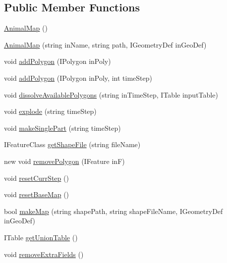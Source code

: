 \subsection*{Public Member Functions}
\begin{DoxyCompactItemize}
\item 
\hyperlink{class_s_e_a_r_c_h_1_1_animal_map_a79382e8c9a4e1cbaae3de901e0fd24ed}{Animal\-Map} ()
\item 
\hyperlink{class_s_e_a_r_c_h_1_1_animal_map_aa2dfd4fc4f942d9b299f4d4b8d501608}{Animal\-Map} (string in\-Name, string path, I\-Geometry\-Def in\-Geo\-Def)
\item 
void \hyperlink{class_s_e_a_r_c_h_1_1_animal_map_a6ed6c8c313feec7be632ef0f4697963f}{add\-Polygon} (I\-Polygon in\-Poly)
\item 
void \hyperlink{class_s_e_a_r_c_h_1_1_animal_map_a5b3b4e4765559402ef5404a2c0373e43}{add\-Polygon} (I\-Polygon in\-Poly, int time\-Step)
\item 
void \hyperlink{class_s_e_a_r_c_h_1_1_animal_map_a8f1f2532da51cd312636ac41d8b6b942}{dissolve\-Available\-Polygons} (string in\-Time\-Step, I\-Table input\-Table)
\item 
void \hyperlink{class_s_e_a_r_c_h_1_1_animal_map_a14b7fe17a2637d6f661e2596211a03f4}{explode} (string time\-Step)
\item 
void \hyperlink{class_s_e_a_r_c_h_1_1_animal_map_ac9ec9757b1cd9fa25cdc0e99a8ba3067}{make\-Single\-Part} (string time\-Step)
\item 
I\-Feature\-Class \hyperlink{class_s_e_a_r_c_h_1_1_animal_map_aa4c372afeca550f23febe2d7808ce585}{get\-Shape\-File} (string file\-Name)
\item 
new void \hyperlink{class_s_e_a_r_c_h_1_1_animal_map_a159d6ec5f0db0e5bdc8a40eb762ba824}{remove\-Polygon} (I\-Feature in\-F)
\item 
void \hyperlink{class_s_e_a_r_c_h_1_1_animal_map_a5988e7ac4983a12321f686f7ccccabe2}{reset\-Curr\-Step} ()
\item 
void \hyperlink{class_s_e_a_r_c_h_1_1_animal_map_a9f2eac746c9e56ca7984928f98a5c0aa}{reset\-Base\-Map} ()
\item 
bool \hyperlink{class_s_e_a_r_c_h_1_1_animal_map_a816576e45d5bc17b258be6b527a171ab}{make\-Map} (string shape\-Path, string shape\-File\-Name, I\-Geometry\-Def in\-Geo\-Def)
\item 
I\-Table \hyperlink{class_s_e_a_r_c_h_1_1_animal_map_ae6743d97a2c8a3aaeb54fcfd29b5b9c7}{get\-Union\-Table} ()
\item 
void \hyperlink{class_s_e_a_r_c_h_1_1_animal_map_aadb33fdab6d0078957ea381189a2f001}{remove\-Extra\-Fields} ()
\end{DoxyCompactItemize}
